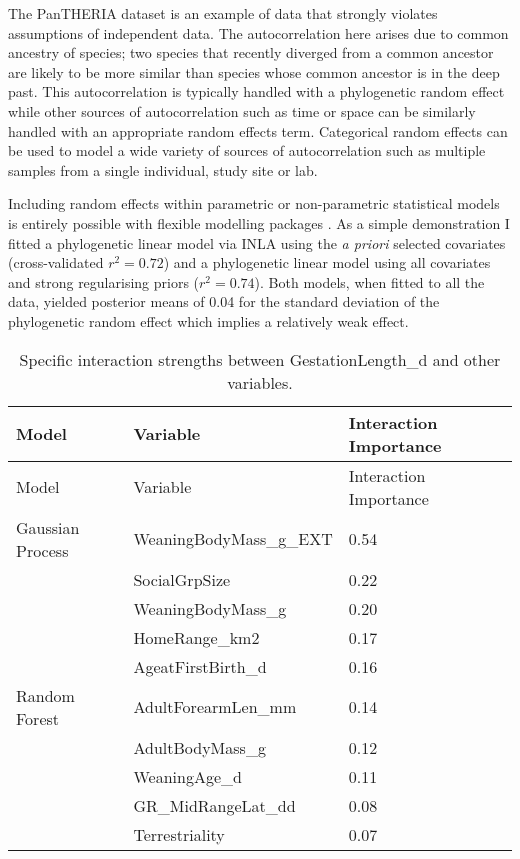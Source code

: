 \documentclass[10pt,]{article}
\begin{document}
The PanTHERIA dataset is an example of data that strongly violates assumptions of independent data.
The autocorrelation here arises due to common ancestry of species; two species that recently diverged from a common ancestor are likely to be more similar than species whose common ancestor is in the deep past.
This autocorrelation is typically handled with a phylogenetic random effect while other sources of autocorrelation such as time or space can be similarly handled with an appropriate random effects term.
Categorical random effects can be used to model a wide variety of sources of autocorrelation such as multiple samples from a single individual, study site or lab.

Including random effects within parametric or non-parametric statistical models is entirely possible with flexible modelling packages \citep{stan, INLA, glmmTMB, tmb}.
As a simple demonstration I fitted a phylogenetic linear model via INLA \citep{INLA} using the \emph{a priori} selected covariates (cross-validated \(r^2 = 0.72\)) and a phylogenetic linear model using all covariates and strong regularising priors (\(r^2 = 0.74\)).
Both models, when fitted to all the data, yielded posterior means of 0.04 for the standard deviation of the phylogenetic random effect which implies a relatively weak effect.

\begin{table}[t!]
\begin{longtable}[c]{@{}lll@{}}
\caption{Specific interaction strengths between GestationLength\_d and other variables. \label{tbl:specificinter}}\tabularnewline
\toprule
Model & Variable & Interaction Importance\tabularnewline
\midrule
\endfirsthead
\toprule
Model & Variable & Interaction Importance\tabularnewline
\midrule
\endhead
Gaussian Process & WeaningBodyMass\_g\_EXT & 0.54\tabularnewline
& SocialGrpSize & 0.22\tabularnewline
& WeaningBodyMass\_g & 0.20\tabularnewline
& HomeRange\_km2 & 0.17\tabularnewline
& AgeatFirstBirth\_d & 0.16\tabularnewline
Random Forest & AdultForearmLen\_mm & 0.14\tabularnewline
& AdultBodyMass\_g & 0.12\tabularnewline
& WeaningAge\_d & 0.11\tabularnewline
& GR\_MidRangeLat\_dd & 0.08\tabularnewline
& Terrestriality & 0.07\tabularnewline
\bottomrule
\end{longtable}
\end{table}
  
\end{document}
